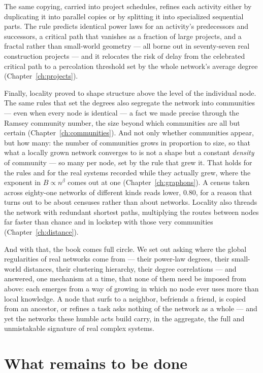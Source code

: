 The same copying, carried into project schedules, refines each activity either by
duplicating it into parallel copies or by splitting it into specialized
sequential parts. The rule predicts identical power laws for an activity's
predecessors and successors, a critical path that vanishes as a fraction of large
projects, and a fractal rather than small-world geometry --- all borne out in
seventy-seven real construction projects --- and it relocates the risk of delay
from the celebrated critical path to a percolation threshold set by the whole
network's average degree (Chapter~\ref{ch:projects}).

Finally, locality proved to shape structure above the level of the individual
node. The same rules that set the degrees also segregate the network into
communities --- even when every node is identical --- a fact we made precise
through the Ramsey community number, the size beyond which communities are all but
certain (Chapter~\ref{ch:communities}). And not only whether communities appear,
but how many: the number of communities grows in proportion to size, so that what a
locally grown network converges to is not a shape but a constant \emph{density} of
community --- so many per node, set by the rule that grew it. That holds for the rules
and for the real systems recorded while they actually grew, where the exponent in
$B\propto n^{\beta}$ comes out at one (Chapter~\ref{ch:graphons}). A census taken
across eighty-one networks of different kinds reads lower, $0.80$, for a reason that
turns out to be about censuses rather than about networks.
Locality also threads the network with redundant shortest paths, multiplying the
routes between nodes far faster than chance and in lockstep with those very
communities (Chapter~\ref{ch:distance}).

And with that, the book comes full circle. We set out asking where the global
regularities of real networks come from --- their power-law degrees, their
small-world distances, their clustering hierarchy, their degree correlations ---
and answered, one mechanism at a time, that none of them need be imposed from
above: each emerges from a way of growing in which no node ever uses more than
local knowledge. A node that surfs to a neighbor, befriends a friend, is copied
from an ancestor, or refines a task asks nothing of the network as a whole --- and
yet the networks these humble acts build carry, in the aggregate, the full and
unmistakable signature of real complex systems.

\section{What remains to be done}

